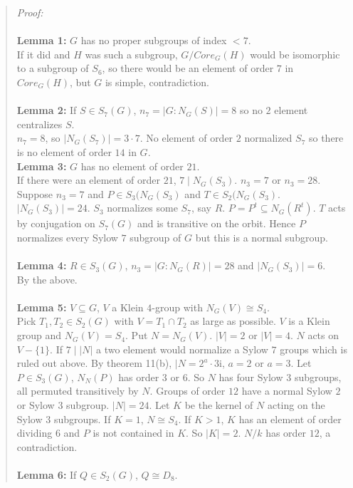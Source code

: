\begin{quote}
\emph{Proof:}
\\
\\
{\bf Lemma 1:} $G$ has no proper subgroups of index $<7$.
\\
If it did and $H$ was such a subgroup, $G/Core_G(H)$ would be isomorphic to a subgroup of $S_6$, so there would be an
element of order $7$ in $Core_G(H)$, but $G$ is simple, contradiction.
\\
\\
{\bf Lemma 2:} If $S \in S_7(G)$, $n_7=|G:N_G(S)|=8$ so no $2$ element centralizes $S$.
\\
$n_7=8$, so $|N_G(S_7)|= 3 \cdot 7$.  No element of order $2$ normalized $S_7$ so there
is no element of order $14$ in $G$.
\\
{\bf Lemma 3:} $G$ has no element of order $21$.
\\
If there were an element of order $21$, $7 \mid N_G(S_3)$.
$n_3= 7$ or $n_3= 28$.  Suppose $n_3=7$ and
$P \in S_3(N_G(S_3)$ and
$T \in S_2(N_G(S_3)$.
$|N_G(S_3)|=24$. $S_3$ normalizes some $S_7$, say $R$. $P = P^t \subseteq N_G(R^t)$.
$T$ acts by conjugation on $S_7(G)$ and is transitive on the orbit. Hence $P$ normalizes
every Sylow $7$ subgroup of $G$ but this is a normal subgroup.
\\
\\
{\bf Lemma 4:} $R \in S_3(G)$,  $n_3=|G:N_G(R)|=28$ and $|N_G(S_3)| = 6$.
\\
By the above.
\\
\\
{\bf Lemma 5:} $V \subseteq G$, $V$ a Klein $4$-group with $N_G(V) \cong S_4$.
\\
Pick $T_1, T_2 \in S_2(G)$ with $V= T_1 \cap T_2$ as large as possible.
$V$ is a Klein group and $N_G(V)=S_4$.  Put $N=N_G(V)$.  $|V| = 2$ or
$|V| = 4$. $N$ acts on $V - \{1\}$.  If $7 \mid |N|$ a two element would
normalize a Sylow $7$ groups which is ruled out above.  By theorem 11(b),
$|N= 2^a \cdot 3$i, $a = 2$ or $a = 3$.  Let $P \in S_3(G)$, $N_N(P)$ has order
$3$ or $6$. So $N$ has four Sylow $3$ subgroups, all permuted transitively by $N$.
Groups of order $12$ have a normal Sylow $2$ or Sylow $3$ subgroup. $|N|=24$.
Let $K$ be the kernel of $N$ acting on the Sylow $3$ subgroups. If $K=1$,
$N \cong S_4$.  If $K > 1$, $K$ has an element of order dividing $6$ and $P$
is not contained in $K$.  So $|K|=2$. $N/k$ has order $12$, a contradiction.
\\
\\
{\bf Lemma 6:} If $Q \in S_2(G)$, $Q \cong D_8$.

\end{quote}
